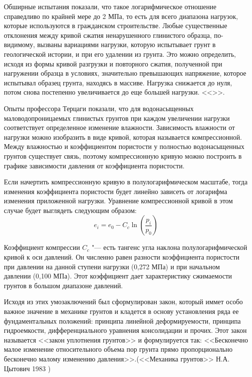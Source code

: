 Обширные испытания показали, что такое логарифмическое отношение справедливо по крайней мере до 2 МПа, то есть для всего диапазона нагрузок, которые используются в гражданском строительстве. Любые существенные отклонения между кривой сжатия ненарушенного глинистого образца, по-видимому, вызваны вариациями нагрузки, которую испытывает грунт в геологической истории, и при его удалении из грунта. Это можно определить, исходя из формы кривой разгрузки и повторного сжатия, полученной при нагружении образца в условиях, значительно превышающих напряжение, которое испытывал образец грунта, находясь в массиве. Нагрузка снижается до нуля, потом снова постепенно увеличивается до еще большей нагрузки. <<\cite{Kazagrande_1936}>>. 
 
 Опыты профессора Терцаги показали, что для водонасыщенных маловодопроницаемых глинистых грунтов при каждом увеличении нагрузки соответствует определенное изменение влажности. 
 Зависимость влажности от нагрузки можно изобразить в виде кривой, которая называется компрессионной. 
 Между влажностью и коэффициентом пористости у полностью водонасыщенных грунтов существует связь, поэтому компрессионную кривую можно построить в графике зависимости давления от коэффициента пористости. 
 
 Если начертить компрессионную кривую в полулогарифмическом масштабе, тогда изменения коэффициента пористости будет линейно зависеть от логарифма изменения приложенной нагрузки. Уравнение компрессионной кривой в этом случае будет выглядеть следующим образом:
 $$e_i=e_0-C_c\ln (\frac{p_i}{p_0})$$
 
 
 Коэффициент компрессии $C_c$ "--- есть тангенс угла наклона полулогарифмической кривой к оси давлений. Он численно равен разности коэффициента пористости при давлении на данной ступени нагрузки (0,272 МПа) и при начальном давлении (0,100 МПа). Этот коэффициент дает характеристику сжимаемости грунтов в большом диапазоне давлений. 
 
 Исходя из этих умозаключений был сформулирован закон, который иммет особо важное значение в механике грунтов и кладется в основу установления ряда ее фундаментальных положений: принципа линейной деформируемости, принципа гидроемкости, дифференциального уравнения консолидации и прочих. Этот закон называется <<закон уплотнения грунтов>> и формулируется так: <<Бесконечно малое изменение относительного объема пор грунта прямо пропорционально бесконечно малому изменению давления>>.(<<Механика грунтов>> Н.А. Цытович 1983 \cite{Citovich_1983})


